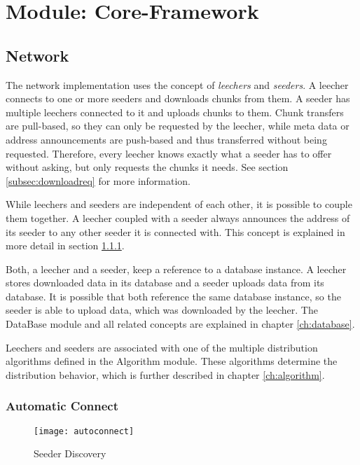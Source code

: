 \chapter{Module: Core-Framework}
\label{ch:core}

\section{Network}
The network implementation uses the concept of \emph{leechers} and \emph{seeders}. A leecher connects to one or more seeders and downloads chunks from them. A seeder has multiple leechers connected to it and uploads chunks to them. Chunk transfers are pull-based, so they can only be requested by the leecher, while meta data or address announcements are push-based and thus transferred without being requested. Therefore, every leecher knows exactly what a seeder has to offer without asking, but only requests the chunks it needs. See section \ref{subsec:downloadreq} for more information.

While leechers and seeders are independent of each other, it is possible to couple them together. A leecher coupled with a seeder always announces the address of its seeder to any other seeder it is connected with. This concept is explained in more detail in section \ref{subsec:autoconnect}.

Both, a leecher and a seeder, keep a reference to a database instance. A leecher stores downloaded data in its database and a seeder uploads data from its database. It is possible that both reference the same database instance, so the seeder is able to upload data, which was downloaded by the leecher. The DataBase module and all related concepts are explained in chapter \ref{ch:database}.

Leechers and seeders are associated with one of the multiple distribution algorithms defined in the Algorithm module. These algorithms determine the distribution behavior, which is further described in chapter \ref{ch:algorithm}.


\subsection{Automatic Connect}
\label{subsec:autoconnect}

\begin{figure}[ht]
	\centering
	\texttt{[image: autoconnect]}
	\caption{Seeder Discovery}
	\label{fig:autoconnect}
\end{figure}

